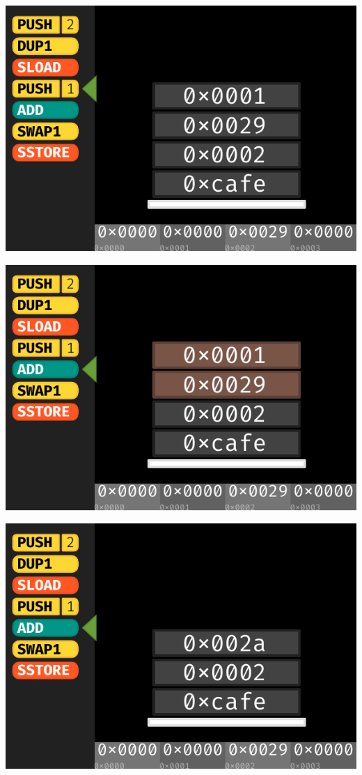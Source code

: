 \documentclass[xcolor=x11names,compress]{beamer}
\begin{document}
\begin{frame}
\begin{overprint}
\begin{center}
		\end{center}
		\begin{center}
			\includegraphics[width=\textwidth,height=0.8\textheight,keepaspectratio]{img/stackmachine/09.pdf}
		\end{center}
		\begin{center}
			\includegraphics[width=\textwidth,height=0.8\textheight,keepaspectratio]{img/stackmachine/10.pdf}
		\end{center}
		\begin{center}
			\includegraphics[width=\textwidth,height=0.8\textheight,keepaspectratio]{img/stackmachine/11.pdf}

\end{center}
\end{overprint}
\end{frame}
\end{document}
